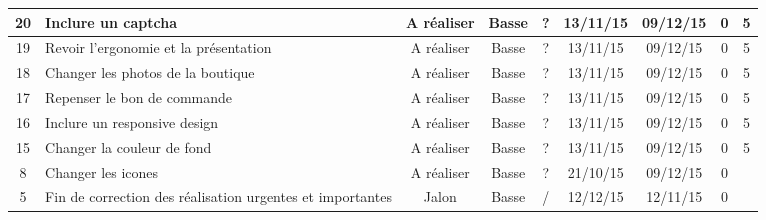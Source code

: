 \begin{tabular}{ | c | p{4cm} | c | c | c | c | c | c | c |  }
20 & Inclure un captcha & A réaliser & Basse & ? & 13/11/15 &
	09/12/15 & 0 & 5 \\ \hline
19 & Revoir l'ergonomie et la présentation & A réaliser & Basse & ? & 13/11/15
	& 09/12/15 & 0 & 5 \\ \hline
18 & Changer les photos de la boutique & A réaliser & Basse & ? & 13/11/15 &
	09/12/15 & 0 & 5 \\ \hline
17 & Repenser le bon de commande & A réaliser & Basse & ? & 13/11/15 & 09/12/15
	& 0 & 5 \\ \hline
16 & Inclure un responsive design & A réaliser & Basse & ? &
	13/11/15 & 09/12/15 & 0 & 5 \\ \hline
15 & Changer la couleur de fond & A réaliser & Basse & ? & 13/11/15 & 09/12/15
	& 0 & 5  \\ \hline
8 & Changer les icones & A réaliser & Basse & ? & 21/10/15 & 09/12/15 & 0 & \\
\hline

5 & Fin de correction des réalisation urgentes et importantes & Jalon & Basse &
	/ & 12/12/15 & 12/11/15 & 0 & \\ \hline
 \end{tabular}